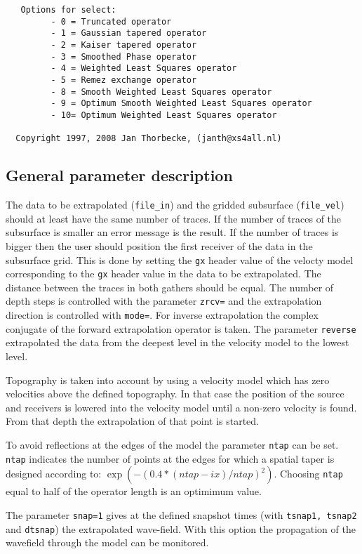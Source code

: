 {\begin{verbatim}
   Options for select:
         - 0 = Truncated operator
         - 1 = Gaussian tapered operator
         - 2 = Kaiser tapered operator
         - 3 = Smoothed Phase operator
         - 4 = Weighted Least Squares operator
         - 5 = Remez exchange operator
         - 8 = Smooth Weighted Least Squares operator
         - 9 = Optimum Smooth Weighted Least Squares operator
         - 10= Optimum Weighted Least Squares operator
 
  Copyright 1997, 2008 Jan Thorbecke, (janth@xs4all.nl) 

\end{verbatim}}

\subsection{General parameter description}

The data to be extrapolated ({\tt file\_in}) and the gridded subsurface ({\tt file\_vel}) should at least have the same number of
traces. If the number of traces of the subsurface is smaller an error message is the result. If the number of traces is bigger then
the user should position the first receiver of the data in the subsurface grid. This is done by setting the {\tt gx} header value of
the velocty model corresponding to the {\tt gx} header value in the data to be extrapolated. The distance between the traces in both
gathers should be equal. The number of depth steps is controlled with the parameter {\tt zrcv=} and the extrapolation direction is controlled with {\tt mode=}. For inverse extrapolation the complex conjugate of the forward extrapolation operator is taken. The parameter {\tt reverse} extrapolated the data from the deepest level in the velocity model to the lowest level. 

Topography is taken into account by using a velocity model which has zero velocities above the defined topography. In that case the position of the source and receivers is lowered into the velocity model until a non-zero velocity is found. From that depth the extrapolation of that point is started. 

To avoid reflections at the edges of the model the parameter {\tt ntap} can be set. {\tt ntap} indicates the number of points at the edges for which a spatial taper is designed according to: $\exp{(-(0.4*(ntap-ix)/ntap)^2)}$. Choosing {\tt ntap} equal to half of the operator length is an optimimum value.

The parameter {\tt snap=1} gives at the defined snapshot times (with {\tt tsnap1, tsnap2} and {\tt dtsnap}) the extrapolated wave-field. With this option the propagation of the wavefield through the model can be monitored. 

